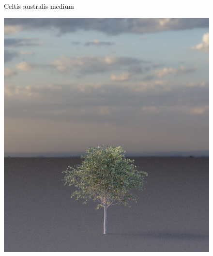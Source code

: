 \begin{figure}[t]
\begin{center}
        \begin{minipage}[c]{0.24\textwidth}
            \begin{flushleft}
                Celtis australis medium
            \end{flushleft}
        \end{minipage}
        \begin{minipage}[c]{0.24\textwidth}
            \includegraphics[valign=c, width=\linewidth]{img/EU06m_mesh.png}
        \end{minipage}
        \begin{minipage}[c]{0.24\textwidth}

\end{minipage}
\end{center}
\end{figure}

